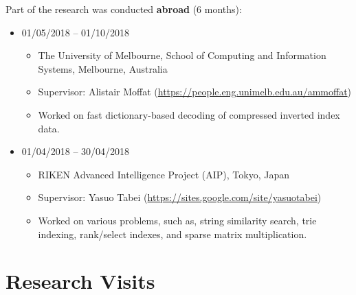 \documentclass[a4paper, sans]{moderncv}
\begin{document}
{\begin{itemize}
\end{itemize}
Part of the research was conducted \textbf{abroad} (6 months):
\begin{itemize}
    \item 01/05/2018 -- 01/10/2018
        \begin{itemize}
            \item The University of Melbourne, School of Computing and Information Systems, Melbourne, Australia
            \item Supervisor: Alistair Moffat (\url{https://people.eng.unimelb.edu.au/ammoffat})
            \item Worked on fast dictionary-based decoding of compressed inverted index data.
        \end{itemize}
    \item 01/04/2018 -- 30/04/2018
        \begin{itemize}
            \item RIKEN Advanced Intelligence Project (AIP), Tokyo, Japan
            \item Supervisor: Yasuo Tabei (\url{https://sites.google.com/site/yasuotabei})
            \item Worked on various problems, such as, string similarity search,
            trie indexing, rank/select indexes, and sparse matrix multiplication.
        \end{itemize}
\end{itemize}
}

\section{Research Visits}




\end{document}
